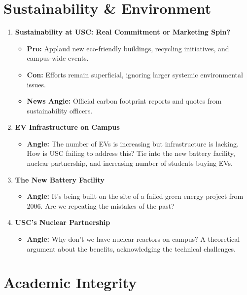 \documentclass{article}
\begin{document}
\section*{Sustainability \& Environment}

\begin{enumerate}[leftmargin=*]
    \item \textbf{Sustainability at USC: Real Commitment or Marketing Spin?}
    \begin{itemize}
        \item \textbf{Pro:} Applaud new eco-friendly buildings, recycling initiatives, and campus-wide events.
        \item \textbf{Con:} Efforts remain superficial, ignoring larger systemic environmental issues.
        \item \textbf{News Angle:} Official carbon footprint reports and quotes from sustainability officers.
    \end{itemize}

    \item \textbf{EV Infrastructure on Campus}
    \begin{itemize}
        \item \textbf{Angle:} The number of EVs is increasing but infrastructure is lacking. How is USC failing to address this? Tie into the new battery facility, nuclear partnership, and increasing number of students buying EVs.
    \end{itemize}

    \item \textbf{The New Battery Facility}
    \begin{itemize}
        \item \textbf{Angle:} It's being built on the site of a failed green energy project from 2006. Are we repeating the mistakes of the past?
    \end{itemize}

    \item \textbf{USC's Nuclear Partnership}
    \begin{itemize}
        \item \textbf{Angle:} Why don't we have nuclear reactors on campus? A theoretical argument about the benefits, acknowledging the technical challenges.
    \end{itemize}
\end{enumerate}

\section*{Academic Integrity}
\end{document}

